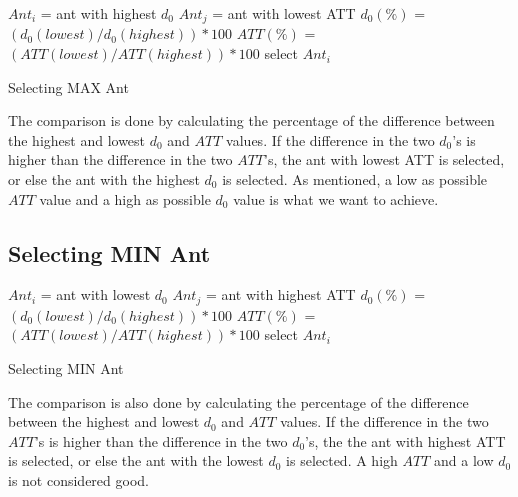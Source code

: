 \begin{algorithm}[H]
$Ant_{i}$ = ant with highest $d_0$\;
$Ant_{j}$ = ant with lowest ATT\;
{
	$d_0(\%)$ = $(d_0(lowest) / d_0(highest))*100$\;
	$ATT(\%)$ = $(ATT(lowest) / ATT(highest))*100$\;
	{
		select $Ant_{i}$
	}
}
 \caption{Selecting MAX Ant}
\end{algorithm}

The comparison is done by calculating the percentage of the difference between the highest and lowest $d_0$ and $ATT$ values. If the difference in the two $d_0$'s is higher than the difference in the two $ATT$'s, the ant with lowest ATT is selected, or else the ant with the highest $d_0$ is selected. As mentioned, a low as possible $ATT$ value and a high as possible $d_0$ value is what we want to achieve.

\subsection{Selecting MIN Ant}
\begin{algorithm}[H]
$Ant_{i}$ = ant with lowest $d_0$\;
$Ant_{j}$ = ant with highest ATT\;
{
	$d_0(\%)$ = $(d_0(lowest) / d_0(highest))*100$\;
	$ATT(\%)$ = $(ATT(lowest) / ATT(highest))*100$\;
	{
		select $Ant_{i}$
	}
}
 \caption{Selecting MIN Ant}
\end{algorithm}
The comparison is also done by calculating the percentage of the difference between the highest and lowest $d_0$ and $ATT$ values. If the difference in the two $ATT$'s is higher than the difference in the two $d_0$'s, the the ant with highest ATT is selected, or else the ant with the lowest $d_0$ is selected. A high $ATT$ and a low $d_0$ is not considered good. 
